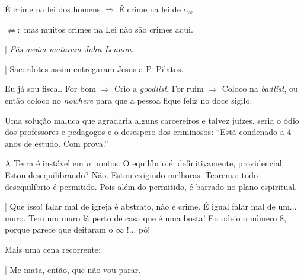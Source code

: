 \documentclass[12pt,a4paper]{article}
\begin{document}
			\'E crime na lei\cite{x} dos homens $ \Rightarrow $ \'E crime na lei de $ \alpha_\omega $

			$\nLeftarrow:$ mas muitos crimes na Lei n\~ao s\~ao crimes aqui.

			\begin{flushright}
			\end{flushright}

			| \emph{F\~as assim mataram John Lennon}.

			| Sacerdotes assim entregaram Jesus a P. Pilatos.

			\begin{flushright}
			\end{flushright}

			Eu j\'a sou fiscal. For bom $ \Rightarrow $ Crio a \emph{goodlist}. For ruim $ \Rightarrow $ Coloco na \emph{badlist}, ou ent\~ao coloco no \emph{nowhere} para que a pessoa fique feliz no doce sigilo.

			\begin{flushright}
			\end{flushright}

			Uma solu\c{c}\~ao maluca que agradaria alguns carcereiros e talvez ju\'izes, seria o \'odio dos professores e pedagogos e o desespero dos criminosos: \textquotedblleft Est\'a condenado a 4 anos de estudo. Com prova.\textquotedblright

			\begin{flushright}
			\end{flushright}

			A Terra\cite{x} \'e inst\'avel em $n$ pontos. O equil\'ibrio \'e, definitivamente, providencial. Estou desequilibrando? N\~ao. Estou exigindo melhoras. Teorema: todo desequil\'ibrio \'e permitido. Pois al\'em do permitido, \'e barrado no plano espiritual.

			\begin{flushright}
			\end{flushright}

			| Que isso! falar mal de igreja \'e abstrato, n\~ao \'e crime. \'E igual falar mal de um... muro. Tem um muro l\'a perto de casa que \'e uma bosta! Eu odeio o n\'umero 8, porque parece que deitaram o $\infty$ !... p\^o!

			\begin{flushright}
			\end{flushright}

			Mais uma cena recorrente:

			| Me mata, ent\~ao, que n\~ao vou parar.
\end{document}
